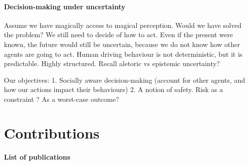 \paragraph{Decision-making under uncertainty}

Assume we have magically access to magical perception. Would we have solved the problem?
We still need to decide of how to act. Even if the present were known, the future would still be uncertain, because we do not know how other agents are going to act.
Human driving behaviour is not deterministic, but it is predictable. Highly structured.
Recall aletoric vs epistemic uncertainty?

Our objectives: 
1. Socially aware decision-making (account for other agents, and how our actions impact their behaviours)
2. A notion of safety. Risk as a constraint ? As a worst-case outcome?

\section{Contributions}

\paragraph{List of publications}